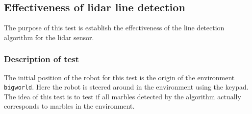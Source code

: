 \documentclass[../Head/Main.tex]{subfiles}
\begin{document}
\subsection{Effectiveness of lidar line detection}

The purpose of this test is establish the effectiveness of the line detection algorithm for the lidar sensor.

\subsubsection{Description of test}
The initial position of the robot for this test is the origin of the environment \texttt{bigworld}. Here the robot is steered around in the environment using the keypad. The idea of this test is to test if all marbles detected by the algorithm actually corresponds to marbles in the environment.     
\end{document}
